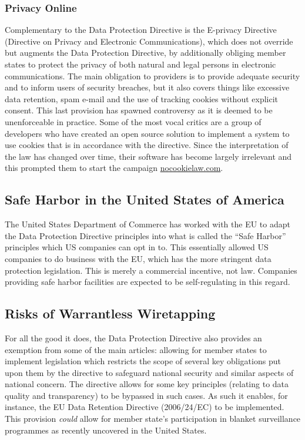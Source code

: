 \documentclass[11pt, a4paper]{article}
\begin{document}
\subsubsection{Privacy Online}
Complementary to the Data Protection Directive is the E-privacy Directive (Directive on Privacy and Electronic Communications), which does not override but augments the Data Protection Directive, by additionally obliging member states to protect the privacy of both natural and legal persons in electronic communications.
The main obligation to providers is to provide adequate security and to inform users of security breaches, but it also covers things like excessive data retention, spam e-mail and the use of tracking cookies without explicit consent.
This last provision has spawned controversy as it is deemed to be unenforceable in practice.
Some of the most vocal critics are a group of developers who have created an open source solution to implement a system to use cookies that is in accordance with the directive.
Since the interpretation of the law has changed over time, their software has become largely irrelevant and this prompted them to start the campaign \url{nocookielaw.com}.


\subsection{Safe Harbor in the United States of America}
The United States Department of Commerce has worked with the EU to adapt the Data Protection Directive principles into what is called the ``Safe Harbor'' principles which US companies can opt in to.
This essentially allowed US companies to do business with the EU, which has the more stringent data protection legislation.
This is merely a commercial incentive, not law.
Companies providing safe harbor facilities are expected to be self-regulating in this regard.

\subsection{Risks of Warrantless Wiretapping}
For all the good it does, the Data Protection Directive also provides an exemption from some of the main articles: allowing for member states to implement legislation which restricts the scope of several key obligations put upon them by the directive to safeguard national security and similar aspects of national concern.
The directive allows for some key principles (relating to data quality and transparency) to be bypassed in such cases.
As such it enables, for instance, the EU Data Retention Directive (2006/24/EC) to be implemented.
This provision \textit{could} allow for member state's participation in blanket surveillance programmes as recently uncovered in the United States.
\end{document}
